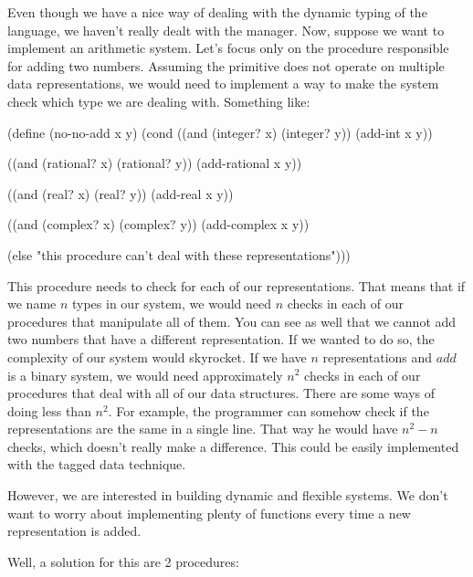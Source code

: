 Even though we have a nice way of dealing with the dynamic typing of the language, we haven't really dealt with the manager. Now, suppose we want to implement an arithmetic system. Let's focus only on the procedure responsible for adding two numbers. Assuming the primitive \var{+} does not operate on multiple data representations, we would need to implement a way to make the system check which type we are dealing with. Something like:

\begin{code}
(define (no-no-add x y)
  (cond ((and (integer? x)
              (integer? y))
         (add-int x y))

        ((and (rational? x)
              (rational? y))
         (add-rational x y))

        ((and (real? x)
              (real? y))
         (add-real x y))

        ((and (complex? x)
              (complex? y))
         (add-complex x y))

        (else "this procedure can't deal with these representations")))
\end{code}

This procedure needs to check for each of our representations. That means that if we name $n$ types in our system, we would need $n$ checks in each of our procedures that manipulate all of them. You can see as well that we cannot add two numbers that have a different representation. If we wanted to do so, the complexity of our system would skyrocket. If we have $n$ representations and $add$ is a binary system, we would need approximately $n^2$ checks in each of our procedures that deal with all of our data structures. There are some ways of doing less than $n^2$. For example, the programmer can somehow check if the representations are the same in a single line. That way he would have $n^2 - n$ checks, which doesn't really make a difference. This could be easily implemented with the tagged data technique.

However, we are interested in building dynamic and flexible systems. We don't want to worry about implementing plenty of functions every time a new representation is added.


Well, a solution for this are 2 procedures:


